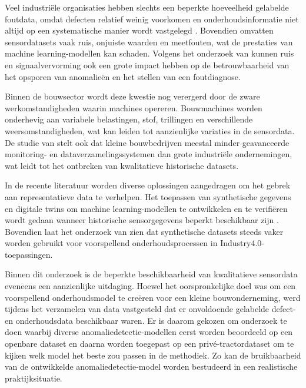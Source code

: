 {{{{{{{{{Veel industriële organisaties hebben slechts een beperkte hoeveelheid gelabelde foutdata, omdat defecten relatief weinig voorkomen en onderhoudsinformatie niet altijd op een systematische manier wordt vastgelegd \autocite{Elahi2023}. Bovendien omvatten sensordatasets vaak ruis, onjuiste waarden en meetfouten, wat de prestaties van machine learning-modellen kan schaden. Volgens het onderzoek van \textcite{Wang2025}  kunnen ruis en signaalvervorming ook een grote impact hebben op de betrouwbaarheid van het opsporen van anomalieën en het stellen van een foutdiagnose.

Binnen de bouwsector wordt deze kwestie nog verergerd door de zware werkomstandigheden waarin machines opereren. Bouwmachines worden onderhevig aan variabele belastingen, stof, trillingen en verschillende weersomstandigheden, wat kan leiden tot aanzienlijke variaties in de sensordata. De studie van \textcite{Mikulic2024} stelt ook dat kleine bouwbedrijven meestal minder geavanceerde monitoring- en dataverzamelingssystemen dan grote industriële ondernemingen, wat leidt tot het ontbreken van kwalitatieve historische datasets.
    
In de recente literatuur worden diverse oplossingen aangedragen om het gebrek aan representatieve data te verhelpen. Het toepassen van synthetische gegevens en digitale twins om machine learning-modellen te ontwikkelen en te verifiëren wordt gedaan wanneer historische sensorgegevens beperkt beschikbaar zijn \autocite{Meddaoui2024, Hu2024}. Bovendien laat het onderzoek van \textcite{Nieminen2026} zien dat synthetische datasets steeds vaker worden gebruikt voor voorspellend onderhoudsprocessen in Industry4.0-toepassingen.

Binnen dit onderzoek is de beperkte beschikbaarheid van kwalitatieve sensordata eveneens een aanzienlijke uitdaging. Hoewel het oorspronkelijke doel was om een voorspellend onderhoudsmodel te creëren voor een kleine bouwonderneming, werd tijdens het verzamelen van data vastgesteld dat er onvoldoende gelabelde defect- en onderhoudsdata beschikbaar waren. Er is daarom gekozen om onderzoek te doen waarbij diverse anomaliedetectie-modellen eerst worden beoordeeld op een openbare dataset en daarna worden toegepast op een privé-tractordataset om te kijken welk model het beste zou passen in de methodiek. Zo kan de bruikbaarheid van de ontwikkelde anomaliedetectie-model worden bestudeerd in een realistische praktijksituatie.

\section{}%
\label{sec:{Synthese en de keuze van de bestudeerde modellen}
    
}}}}}}}}}}
